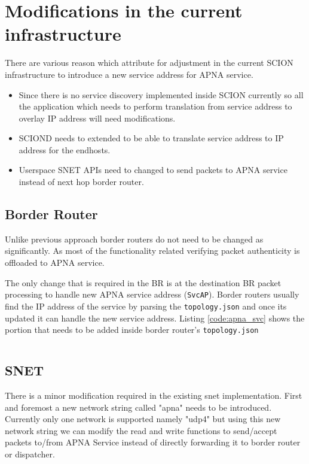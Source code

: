 \section{Modifications in the current infrastructure}
There are various reason which attribute for adjustment in the current SCION infrastructure to introduce a new service address for APNA service.

\begin{itemize}
    \item Since there is no service discovery implemented inside SCION currently so all the application which needs to perform translation from service address to overlay IP address will need modifications.
    \item SCIOND needs to extended to be able to translate service address to IP address for the endhosts.
    \item Userspace SNET APIs need to changed to send packets to APNA service instead of next hop border router.
\end{itemize}

\subsection{Border Router}
Unlike previous approach border routers do not need to be changed as significantly. As most of the functionality related verifying packet authenticity is offloaded to APNA service.

The only change that is required in the BR is at the destination BR packet processing to handle new APNA service address (\texttt{SvcAP}). Border routers usually find the IP address of the service by parsing the \texttt{topology.json} and once its updated it can handle the new service address. Listing \ref{code:apna_svc} shows the portion that needs to be added inside border router's \texttt{topology.json}

\begin{code}
\inputminted[frame=lines, framesep=2mm, baselinestretch=1.2, fontsize=\footnotesize, linenos]{json}{code_snippets/apnasvc.json} \label{code:apna_svc}
\end{code}

\subsection{SNET}
There is a minor modification required in the existing snet implementation. First and foremost a new network string called "apna" needs to be introduced. Currently only one network is supported namely "udp4" but using this new network string we can modify the read and write functions to send/accept packets to/from APNA Service instead of directly forwarding it to border router or dispatcher.

